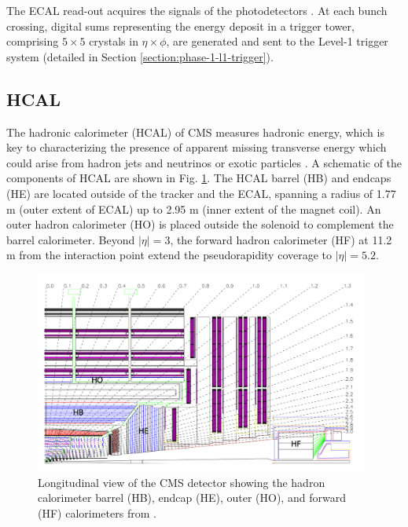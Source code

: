 The ECAL read-out acquires the signals of the photodetectors  \cite{CMS-2008-JINST-3-S08004}. At each bunch crossing, digital sums representing the energy deposit in a trigger tower, comprising $5 \times 5$ crystals in $\eta \times \phi$, are generated and sent to the Level-1 trigger system (detailed in Section \ref{section:phase-1-l1-trigger}).

\subsection{HCAL}
The hadronic calorimeter (HCAL) of CMS measures hadronic energy, which is key to characterizing the presence of apparent missing transverse energy which could arise from hadron jets and neutrinos or exotic particles \cite{CMS-2008-JINST-3-S08004}. A schematic of the components of HCAL are shown in Fig. \ref{fig:phase-1-HCAL-schematic}. The HCAL barrel (HB) and endcaps (HE) are located outside of the tracker and the ECAL, spanning a radius of 1.77 m (outer extent of ECAL) up to 2.95 m (inner extent of the magnet coil). An outer hadron calorimeter (HO) is placed outside the solenoid to complement the barrel calorimeter. Beyond $|\eta| = 3$, the forward hadron calorimeter (HF) at 11.2 m from the interaction point extend the pseudorapidity coverage to $|\eta| = 5.2$.

\begin{figure}[ht]
    \centering
    \includegraphics[width=11cm]{figures/ch-2-cern-cms/phase-1-HCAL-schematic.png}
    \caption[Longitudinal view of the CMS detector showing the hadron calorimeter barrel (HB), endcap (HE), outer (HO), and forward (HF) calorimeters.]{Longitudinal view of the CMS detector showing the hadron calorimeter barrel (HB), endcap (HE), outer (HO), and forward (HF) calorimeters from \cite{CMS-2008-JINST-3-S08004}.}
    \label{fig:phase-1-HCAL-schematic}
\end{figure}

